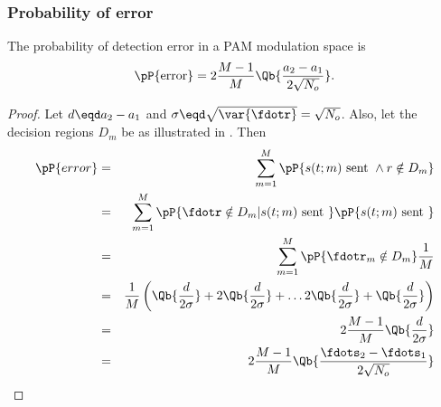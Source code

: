 \subsubsection{Probability of error}
\begin{theorem}
The probability of detection error in a PAM modulation space is
   \[ \pP{\mbox{error}} = 2\frac{M-1}{M} \Qb{\frac{a_2-a_1}{2\sqrt{N_o}}} .\]
\end{theorem}

\begin{proof}
Let $d\eqd a_2-a_1$ and $\sigma\eqd \sqrt{\var{\fdotr}}=\sqrt{N_o}$.
Also, let the decision regions $D_m$ be as illustrated in .
Then
\begin{eqnarray*}
   \pP{error}
     &=& \sum_{m=1}^M \pP{s(t;m) \mbox{ sent } \land r\notin D_m} 
   \\&=& \sum_{m=1}^M \pP{\fdotr \notin D_m | s(t;m) \mbox{ sent } }\pP{s(t;m) \mbox{ sent }} 
   \\&=& \sum_{m=1}^M \pP{\fdotr_m \notin D_m } \frac{1}{M}
   \\&=& \frac{1}{M}\left(
             \Qb{\frac{d}{2\sigma}} +
            2\Qb{\frac{d}{2\sigma}} + 
            \ldots
            2\Qb{\frac{d}{2\sigma}} + 
             \Qb{\frac{d}{2\sigma}} 
         \right)
   \\&=& 2\frac{M-1}{M} \Qb{\frac{d}{2\sigma}} 
   \\&=& 2\frac{M-1}{M} \Qb{\frac{\fdots_2-\fdots_1}{2\sqrt{N_o}}} 
\end{eqnarray*}
\end{proof}




